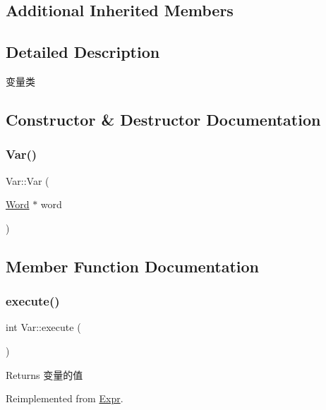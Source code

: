 \subsection*{Additional Inherited Members}


\subsection{Detailed Description}
变量类 

\subsection{Constructor \& Destructor Documentation}
\mbox{\label{class_var_ab111df39c1575d7ba1f96f3b89574b8c}} 
\subsubsection{\texorpdfstring{Var()}{Var()}}
{\footnotesize\ttfamily Var\+::\+Var (\begin{DoxyParamCaption}\item[{\hyperlink{class_word}{Word} $\ast$}]{word }\end{DoxyParamCaption})}



\subsection{Member Function Documentation}
\mbox{\label{class_var_a9dc96e803f7b0f9aa519c2c0e0a6bd8f}} 
\subsubsection{\texorpdfstring{execute()}{execute()}}
{\footnotesize\ttfamily int Var\+::execute (\begin{DoxyParamCaption}{ }\end{DoxyParamCaption})\hspace{0.3cm}{\ttfamily [virtual]}}

\begin{DoxyReturn}{Returns}
变量的值 
\end{DoxyReturn}


Reimplemented from \hyperlink{class_expr_aff6a2e6eaa460e2a3db28ebdab089b51}{Expr}.


